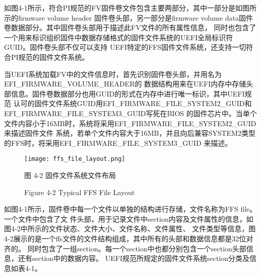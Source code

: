 如图4-1所示，符合PI规范的FV固件卷文件包含主要两部分，其中一部分是如图所示的firmware volume header
固件卷头部，另一部分是firmware volume data固件卷数据部分。其中固件卷头部用于描述此FV文件的所有属性信息，
同时也包含了一个用来标识组织固件中数据存储格式的固件文件系统的UEFI全局标识符GUID。固件卷头部不仅可以支持
UEFI特定的FFS固件文件系统，还支持一切符合PI规范的固件文件系统。
\par 当UEFI系统加载FV中的文件信息时，首先识别固件卷头部，并用名为EFI\_FIRMWARE\_VOLUME\_HEADER的
数据结构用来在UEFI内存中存储头部信息。固件卷数据部分也用GUID的形式在内存中进行唯一标识，其中UEFI规范
认可的固件文件系统GUID用EFI\_FIRMWARE\_FILE\_SYSTEM2\_GUID和EFI\_FIRMWARE\_FILE\_SYSTEM3\_GUID写死在BIOS
的固件芯片中。当单个文件内容小于16MB时，系统将采用EFI\_FIRMWARE\_FILE\_SYSTEM2\_GUID来描述固件文件
系统，若单个文件内容大于16MB，并且向后兼容SYSTEM2类型的FFS时，将采用EFI\_FIRMWARE\_FILE\_SYSTEM3\_GUID
来描述。

\begin{figure}[htb]
    \vspace{0cm}   
    \setlength{\abovecaptionskip}{0.3cm}
	\centering
    \texttt{[image: ffs\_file\_layout.png]}
    \caption*{图 4-2 固件文件系统文件布局}
    \setlength{\belowcaptionskip}{-0.7cm}
    \caption*{Figure 4-2 Typical FFS File Layout}
\end{figure}

\par 如图4-1所示，固件卷中每一个文件以单独的结构进行存储，文件名称为FFS file。一个文件中包含了文
件头部，用于记录文件中section内容及文件属性的信息，如图4-2中所示的文件状态、文件大小、文件名称、文件属性、
文件类型等信息，图4-2展示的是一个ffs文件的文件结构组成，其中所有的头部和数据信息都是32位对齐的。
同时包含了一组section。每一个section中也都分别包含一个section头部信息，还有section中的数据内容。
UEFI规范所规定的固件文件系统section分类及信息如表4-1。

